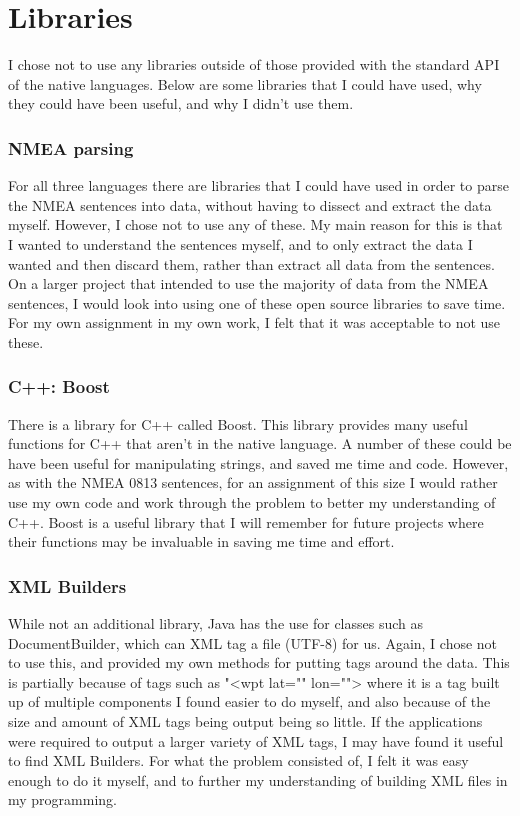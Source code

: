 \documentclass{article}
\begin{document}

\section{Libraries}

I chose not to use any libraries outside of those provided with the standard API of the native languages. Below are some libraries that I could have used, why they could have been useful, and why I didn't use them.

\subsubsection{NMEA parsing}
For all three languages there are libraries that I could have used in order to parse the NMEA sentences into data, without having to dissect and extract the data\cite{nmeajava}\cite{nmeacplusplus} myself. However, I chose not to use any of these. My main reason for this is that I wanted to understand the sentences myself, and to only extract the data I wanted and then discard them, rather than extract all data from the sentences. On a larger project that intended to use the majority of data from the NMEA sentences, I would look into using one of these open source libraries to save time. For my own assignment in my own work, I felt that it was acceptable to not use these.

\subsubsection{C++: Boost}
There is a library for C++ called Boost\cite{boost}. This library provides many useful functions for C++ that aren't in the native language. A number of these could be have been useful for manipulating strings, and saved me time and code. However, as with the NMEA 0813 sentences, for an assignment of this size I would rather use my own code and work through the problem to better my understanding of C++. Boost is a useful library that I will remember for future projects where their functions may be invaluable in saving me time and effort.

\subsubsection{XML Builders}
While not an additional library, Java has the use for classes such as DocumentBuilder\cite{javaxml}\cite{documentbuilder}, which can XML tag a file (UTF-8) for us. Again, I chose not to use this, and provided my own methods for putting tags around the data. This is partially because of tags such as "<wpt lat="" lon=""> where it is a tag built up of multiple components I found easier to do myself, and also because of the size and amount of XML tags being output being so little. If the applications were required to output a larger variety of XML tags, I may have found it useful to find XML Builders. For what the problem consisted of, I felt it was easy enough to do it myself, and to further my understanding of building XML files in my programming.
\end{document}
